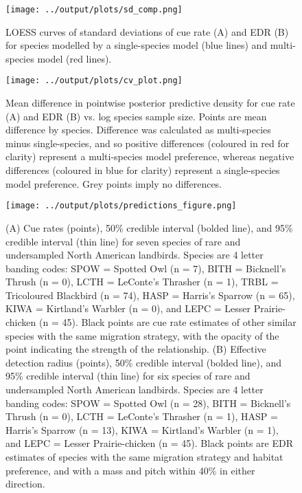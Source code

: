 \documentclass[12pt]{article}
\begin{document}
\begin{figure}[h]
	\texttt{[image: ../output/plots/sd\_comp.png]}
	\caption{LOESS curves of standard deviations of cue rate (A) and EDR (B) for species modelled by a single-species model (blue lines) and multi-species model (red lines).}
	\label{fig:sd}
\end{figure}

\begin{figure}[h]
	\texttt{[image: ../output/plots/cv\_plot.png]}
	\caption{Mean difference in pointwise posterior predictive density for cue rate (A) and EDR (B) vs. log species sample size. Points are mean difference by species. Difference was calculated as multi-species minus single-species, and so positive differences (coloured in red for clarity) represent a multi-species model preference, whereas negative differences (coloured in blue for clarity) represent a single-species model preference. Grey points imply no differences. }
	\label{fig:cv}
\end{figure}

\begin{figure}[h]
	\texttt{[image: ../output/plots/predictions\_figure.png]}
	\caption{(A) Cue rates (points), 50\% credible interval (bolded line), and 95\% credible interval (thin line) for seven species of rare and undersampled North American landbirds. Species are 4 letter banding codes: SPOW = Spotted Owl (n = 7), BITH = Bicknell's Thrush (n = 0), LCTH = LeConte's Thrasher (n = 1), TRBL = Tricoloured Blackbird (n = 74), HASP = Harris's Sparrow (n = 65), KIWA = Kirtland's Warbler (n = 0), and LEPC = Lesser Prairie-chicken (n = 45). Black points are cue rate estimates of other similar species with the same migration strategy, with the opacity of the point indicating the strength of the relationship. (B) Effective detection radius (points), 50\% credible interval (bolded line), and 95\% credible interval (thin line) for six species of rare and undersampled North American landbirds. Species are 4 letter banding codes: SPOW = Spotted Owl (n = 28), BITH = Bicknell's Thrush (n = 0), LCTH = LeConte's Thrasher (n = 1), HASP = Harris's Sparrow (n = 13), KIWA = Kirtland's Warbler (n = 1), and LEPC = Lesser Prairie-chicken (n = 45). Black points are EDR estimates of species with the same migration strategy and habitat preference, and with a mass and pitch within 40\% in either direction.}
	\label{fig:predictions}
\end{figure}
\end{document}
